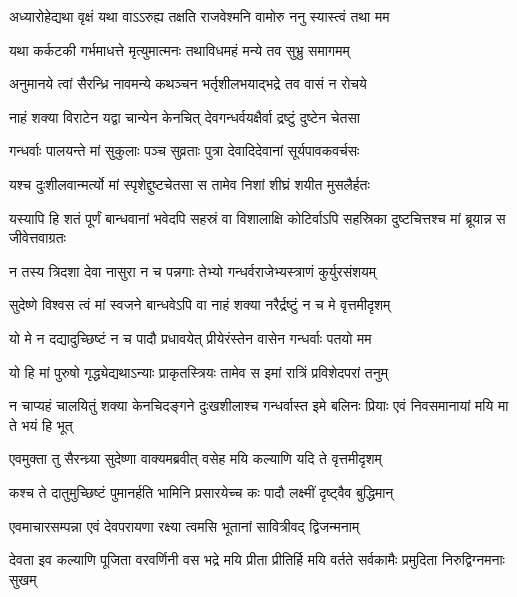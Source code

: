 \twolineshloka
{अध्यारोहेद्यथा वृक्षं यथा वाऽऽरुह्य तक्षति}
{राजवेश्मनि वामोरु ननु स्यास्त्वं तथा मम}


\twolineshloka
{यथा कर्कटकी गर्भमाधत्ते मृत्युमात्मनः}
{तथाविधमहं मन्ये तव सुभ्रु समागमम्}


\twolineshloka
{अनुमानये त्वां सैरन्ध्रि नावमन्ये कथञ्चन}
{भर्तृशीलभयाद्भद्रे तव वासं न रोचये}




\twolineshloka
{नाहं शक्या विराटेन यद्वा चान्येन केनचित्}
{देवगन्धर्वयक्षैर्वा द्रष्टुं दुष्टेन चेतसा}


\twolineshloka
{गन्धर्वाः पालयन्ते मां सुकुलाः पञ्च सुव्रताः}
{पुत्रा देवादिदेवानां सूर्यपावकवर्चसः}


\twolineshloka
{यश्च दुःशीलवान्मर्त्यो मां स्पृशेद्दुष्टचेतसा}
{स तामेव निशां शीघ्रं शयीत मुसलैर्हतः}


\threelineshloka
{यस्यापि हि शतं पूर्णं बान्धवानां भवेदपि}
{सहस्रं वा विशालाक्षि कोटिर्वाऽपि सहस्रिका}
{दुष्टचित्तश्च मां ब्रूयान्न स जीवेत्तवाग्रतः}


\twolineshloka
{न तस्य त्रिदशा देवा नासुरा न च पन्नगाः}
{तेभ्यो गन्धर्वराजेभ्यस्त्राणं कुर्युरसंशयम्}


\twolineshloka
{सुदेष्णे विश्वस त्वं मां स्वजने बान्धवेऽपि वा}
{नाहं शक्या नरैर्द्रष्टुं न च मे वृत्तमीदृशम्}


\twolineshloka
{यो मे न दद्यादुच्छिष्टं न च पादौ प्रधावयेत्}
{प्रीयेरंस्तेन वासेन गन्धर्वाः पतयो मम}


\twolineshloka
{यो हि मां पुरुषो गृद्ध्येद्यथाऽन्याः प्राकृतस्त्रियः}
{तामेव स इमां रात्रिं प्रविशेदपरां तनुम्}


\threelineshloka
{न चाप्यहं चालयितुं शक्या केनचिदङ्गने}
{दुःखशीलाश्च गन्धर्वास्त इमे बलिनः प्रियाः}
{एवं निवसमानायां मयि मा ते भयं हि भूत्}



\twolineshloka
{एवमुक्ता तु सैरन्ध्र्या सुदेष्णा वाक्यमब्रवीत्}
{वसेह मयि कल्याणि यदि ते वृत्तमीदृशम्}


\twolineshloka
{कश्च ते दातुमुच्छिष्टं पुमानर्हति भामिनि}
{प्रसारयेच्च कः पादौ लक्ष्मीं दृष्ट्वैव बुद्धिमान्}


\twolineshloka
{एवमाचारसम्पन्ना एवं देवपरायणा}
{रक्ष्या त्वमसि भूतानां सावित्रीवद् द्विजन्मनाम्}


\threelineshloka
{देवता इव कल्याणि पूजिता वरवर्णिनी}
{वस भद्रे मयि प्रीता प्रीतिर्हि मयि वर्तते}
{सर्वकामैः प्रमुदिता निरुद्विग्नमनाः सुखम्}


